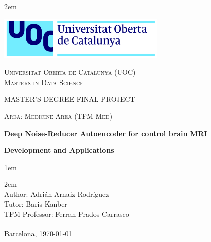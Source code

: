 \newpage
\thispagestyle{empty}

\baselineskip 2em


\centerline{\includegraphics[width=0.6\textwidth]{images/UOC-logo}}
\begin{center}
\textsc{Universitat Oberta de Catalunya (UOC) \\
 Masters in Data Science\\}


\vspace*{1.5cm}

\textsc{\Large MASTER'S DEGREE FINAL PROJECT}

\vspace*{0.5cm}

\textsc{\large Area: Medicine Area (TFM-Med)}



\vspace*{2.0cm}

\textbf{\Large Deep Noise-Reducer Autoencoder for control brain MRI}

\textbf{\large Development and Applications}

\vspace{2.5cm}
\baselineskip 1em

\baselineskip 2em
-----------------------------------------------------------------------------\\
Author:     Adrián Arnaiz Rodríguez\\
Tutor:      Baris Kanber\\
TFM Professor: Ferran Prados Carrasco\\
-----------------------------------------------------------------------------\\
\vspace*{1.5cm}
Barcelona, \today

\end{center}

\newpage
\pagestyle{empty}
\hfill
